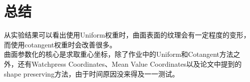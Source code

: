 \documentclass[14pt]{scrartcl} %
\begin{document}
\pagebreak
\section{总结}
从实验结果可以看出使用Uniform权重时，曲面表面的纹理会有一定程度的变形，而使用cotangent权重时会改善很多。\\
曲面参数化的核心是求取重心坐标，除了作业中的Uniform和Cotangent方法之外，还有Watchpress Coordinates、Mean Value Coordinates以及论文\cite{floater1997parametrization}中提到的shape preserving方法，由于时间原因没来得及一一测试。



\end{document}
